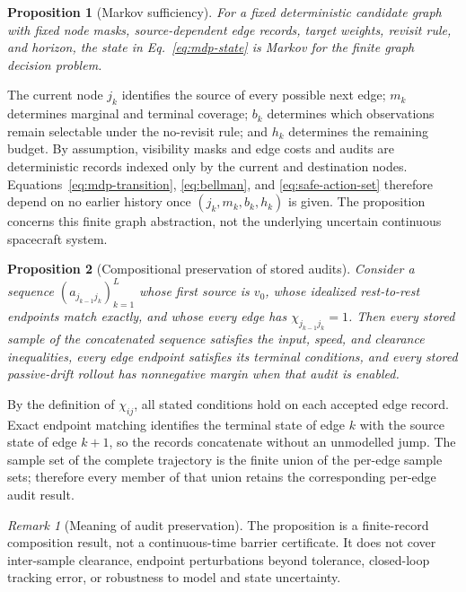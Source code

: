 \documentclass{IEEEtaes}
\newtheorem{proposition}{Proposition}
\theoremstyle{remark}
\newtheorem{remark}{Remark}
\theoremstyle{plain}
\begin{document}
\begin{proposition}[Markov sufficiency]
\label{prop:markov-sufficiency}
For a fixed deterministic candidate graph with fixed node masks, source-dependent edge records, target weights, revisit rule, and horizon, the state in Eq.~\eqref{eq:mdp-state} is Markov for the finite graph decision problem.
\end{proposition}

\begin{IEEEproof}
The current node $j_k$ identifies the source of every possible next edge; $m_k$ determines marginal and terminal coverage; $b_k$ determines which observations remain selectable under the no-revisit rule; and $h_k$ determines the remaining budget. By assumption, visibility masks and edge costs and audits are deterministic records indexed only by the current and destination nodes. Equations~\eqref{eq:mdp-transition}, \eqref{eq:bellman}, and \eqref{eq:safe-action-set} therefore depend on no earlier history once $(j_k,m_k,b_k,h_k)$ is given. The proposition concerns this finite graph abstraction, not the underlying uncertain continuous spacecraft system.
\end{IEEEproof}

\begin{proposition}[Compositional preservation of stored audits]
\label{prop:audit-composition}
Consider a sequence $(a_{j_{k-1}j_k})_{k=1}^{L}$ whose first source is $v_0$, whose idealized rest-to-rest endpoints match exactly, and whose every edge has $\chi_{j_{k-1}j_k}=1$. Then every stored sample of the concatenated sequence satisfies the input, speed, and clearance inequalities, every edge endpoint satisfies its terminal conditions, and every stored passive-drift rollout has nonnegative margin when that audit is enabled.
\end{proposition}

\begin{IEEEproof}
By the definition of $\chi_{ij}$, all stated conditions hold on each accepted edge record. Exact endpoint matching identifies the terminal state of edge $k$ with the source state of edge $k+1$, so the records concatenate without an unmodelled jump. The sample set of the complete trajectory is the finite union of the per-edge sample sets; therefore every member of that union retains the corresponding per-edge audit result.
\end{IEEEproof}

\begin{remark}[Meaning of audit preservation]
The proposition is a finite-record composition result, not a continuous-time barrier certificate. It does not cover inter-sample clearance, endpoint perturbations beyond tolerance, closed-loop tracking error, or robustness to model and state uncertainty.
\end{remark}
\end{document}
